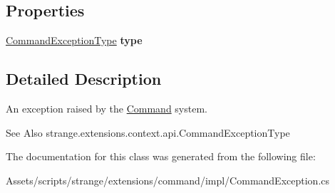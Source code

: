 \subsection*{Properties}
\begin{DoxyCompactItemize}
\item 
\hypertarget{classstrange_1_1extensions_1_1command_1_1impl_1_1_command_exception_a747aab5606e9b9be1e14da8d167c9c83}{\hyperlink{namespacestrange_1_1extensions_1_1command_1_1api_a27c9226cc8d55624f3294319d48879e3}{Command\-Exception\-Type} {\bfseries type}}\label{classstrange_1_1extensions_1_1command_1_1impl_1_1_command_exception_a747aab5606e9b9be1e14da8d167c9c83}

\end{DoxyCompactItemize}


\subsection{Detailed Description}
An exception raised by the \hyperlink{classstrange_1_1extensions_1_1command_1_1impl_1_1_command}{Command} system. 

\begin{DoxySeeAlso}{See Also}
strange.\-extensions.\-context.\-api.\-Command\-Exception\-Type 
\end{DoxySeeAlso}


The documentation for this class was generated from the following file\-:\begin{DoxyCompactItemize}
\item 
Assets/scripts/strange/extensions/command/impl/Command\-Exception.\-cs\end{DoxyCompactItemize}
